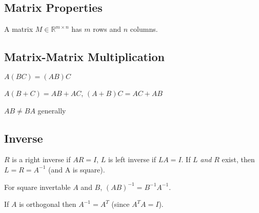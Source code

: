 \documentclass[10pt]{extarticle}
\begin{document}
\begin{multicols*}{2}
\section{Matrix Properties}
A matrix $M \in \mathbb{R}^{m \times n}$ has $m$ rows and $n$ columns.

\subsection{Matrix-Matrix Multiplication}

\begin{compactitem}
	\item $A(BC) = (AB)C$
	\item $A(B + C) = AB + AC$, $(A+B)C = AC + AB$
	\item	$AB \neq BA$ generally
\end{compactitem}


\subsection{Inverse}
$R$ is a right inverse if $AR=I$, $L$ is left inverse if $LA=I$. If $L$ \emph{and} $R$ exist, then $L=R=A^{-1}$ (and A is square).
\begin{compactitem}
\item For square invertable $A$ and $B$, $(AB)^{-1} = B^{-1} A^{-1}$. %
	\item If $A$ is orthogonal then $A^{-1} = A^T$ (since $A^T A = I$).	
\end{compactitem}


\end{multicols*}
\end{document}
